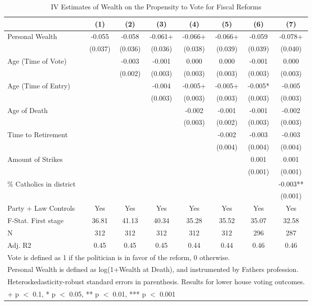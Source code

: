 \begin{table}

\caption{\label{tab:ivresults_othermodels1}IV Estimates of Wealth on the Propensity to Vote for Fiscal Reforms}
\centering
\begin{tabular}[t]{lccccccc}
\toprule
  & (1) & (2) & (3) & (4) & (5) & (6) & (7)\\
\midrule
Personal Wealth & -0.055 & -0.058 & -0.061+ & -0.066+ & -0.066+ & -0.059 & -0.078+\\
 & (0.037) & (0.036) & (0.036) & (0.038) & (0.039) & (0.039) & (0.040)\\
Age (Time of Vote) &  & -0.003 & -0.001 & 0.000 & 0.000 & -0.001 & 0.000\\
 &  & (0.002) & (0.003) & (0.003) & (0.003) & (0.003) & (0.003)\\
Age (Time of Entry) &  &  & -0.004 & -0.005+ & -0.005+ & -0.005* & -0.005\\
 &  &  & (0.003) & (0.003) & (0.003) & (0.003) & (0.003)\\
Age of Death &  &  &  & -0.002 & -0.001 & -0.001 & -0.002\\
 &  &  &  & (0.003) & (0.002) & (0.003) & (0.003)\\
Time to Retirement &  &  &  &  & -0.002 & -0.003 & -0.003\\
 &  &  &  &  & (0.004) & (0.004) & (0.004)\\
Amount of Strikes &  &  &  &  &  & 0.001 & 0.001\\
 &  &  &  &  &  & (0.001) & (0.001)\\
\% Catholics in district &  &  &  &  &  &  & -0.003**\\
 &  &  &  &  &  &  & (0.001)\\
\midrule
Party + Law Controls & Yes & Yes & Yes & Yes & Yes & Yes & Yes\\
F-Stat. First stage & 36.81 & 41.13 & 40.34 & 35.28 & 35.52 & 35.07 & 32.58\\
N & 312 & 312 & 312 & 312 & 312 & 296 & 287\\
Adj. R2 & 0.45 & 0.45 & 0.45 & 0.44 & 0.44 & 0.46 & 0.46\\
\bottomrule
\multicolumn{8}{l}{\rule{0pt}{1em}Vote is defined as 1 if the politician is in favor of the reform, 0 otherwise.}\\
\multicolumn{8}{l}{\rule{0pt}{1em}Personal Wealth is defined as log(1+Wealth at Death), and instrumented by Fathers profession.}\\
\multicolumn{8}{l}{\rule{0pt}{1em}Heteroskedasticity-robust standard errors in parenthesis. Results for lower house voting outcomes.}\\
\multicolumn{8}{l}{\rule{0pt}{1em}+ p $<$ 0.1, * p $<$ 0.05, ** p $<$ 0.01, *** p $<$ 0.001}\\
\end{tabular}
\end{table}

